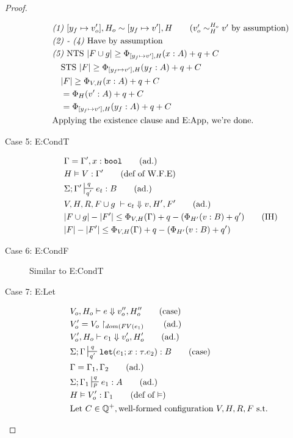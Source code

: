 \documentclass[11pt]{article}
\newcommand{\irl}[1]{\mathtt{#1}}
\newcommand{\veq}[4]{#3 \sim^{#1}_{#2} #4}
\theoremstyle{definition}
\begin{document}
\begin{proof}
\begin{description}
\begin{align*}
			&\emph{(1) }[y_f \mapsto v_o'],H_o \sim [y_f \mapsto v'],H 
				\tag{$\veq{H_o}{H}{v_o'}{v'}$ by assumption}\\
			&\emph{(2) - (4) } \text{Have by assumption }\\
			&\emph{(5) } \text{NTS } |F \cup g| \ge \Phi_{[y_f \mapsto v'],H}(x : A) + q + C\\
			&\quad \text{STS } |F| \ge  \Phi_{[y_f \mapsto v'],H}(y_f : A) + q + C\\
			&\quad |F| \ge \Phi_{V,H}(x : A) + q + C\\
			&\quad = \Phi_H(v' : A) + q + C\\
			&\quad = \Phi_{[y_f \mapsto v'],H}(y_f : A) + q + C\\
			&\text{Applying the existence clause and E:App, we're done. }
		\end{align*}
  \item[Case 5: E:CondT]
  \begin{align*}
  &\Gamma = \Gamma', x : \irl{bool} \tag{ad.}\\
  &H \vDash V : \Gamma' \tag{def of W.F.E}\\
  &\Sigma; \Gamma' \sststile{q'}{q} e_t : B \tag{ad.}\\
  &V,H,R,F \cup g\; \vdash e_t \Downarrow v, H',F' \tag{ad.}\\
  &|F \cup g| - |F'| \le \Phi_{V,H}(\Gamma) +q - (\Phi_{H'}(v:B) + q') \tag{IH}\\
  &|F| - |F'| \le \Phi_{V,H}(\Gamma) +q - (\Phi_{H'}(v:B) + q') \\
  \end{align*}
  \item[Case 6: E:CondF] 
  Similar to E:CondT
  \item[Case 7: E:Let]
  \begin{align*}
  &V_o,H_o \vdash e \Downarrow v_o'',H_o'' \tag{case}\\
		&V_o' = V_o\restriction_{dom(FV(e_1)} \tag{ad.}\\
  &V_o',H_o \vdash e_1 \Downarrow v_o',H_o' \tag{ad.}\\
		&\Sigma; \Gamma \sststile{q'}{q} \irl{let}(e_1; x : \tau.e_2) : B \tag{case}\\
		&\Gamma = \Gamma_1,\Gamma_2 \tag{ad.}\\
  &\Sigma; \Gamma_1 \sststile{p}{q} e_1 : A \tag{ad.}\\
  &H \vDash V_o' : \Gamma_1 \tag{def of $\vDash$}\\
		&\text{Let } C \in \mathbb{Q}^+, \text{well-formed configuration } V,H,R,F \text{ s.t. }

\end{align*}
\end{description}
\end{proof}
\end{document}
